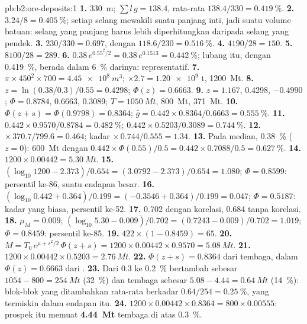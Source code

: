 \begin{solution}{pb:b2:ore-deposits:1}
\textbf{1.} \qty{330}{m}; $\sum l\,g = 138.4$, rata-rata $138.4/330 = \qty{0.419}{\percent}$.
\textbf{2.} $3.24/8 = \qty{0.405}{\percent}$; setiap selang mewakili suatu panjang inti, jadi suatu
volume batuan: selang yang panjang harus lebih diperhitungkan daripada selang yang pendek.
\textbf{3.} $230/330 = 0.697$, dengan $118.6/230 = \qty{0.516}{\percent}$.
\textbf{4.} $4190/28 = 150$.
\textbf{5.} $8100/28 = 289$.
\textbf{6.} $0.38\,e^{0.55^2/2} = 0.38\,e^{0.1513} = \qty{0.442}{\percent}$; lubang itu, dengan
\qty{0.419}{\percent}, berada dalam \qty{6}{\percent} darinya: representatif.
\textbf{7.} $\pi \times 450^2 \times 700 = \qty{4.45e8}{m^3}$; $\times 2.7 = \num{1.20e9}$ t,
\qty{1200}{Mt}.
\textbf{8.} $z = \ln(0.38/0.3)/0.55 = 0.4298$; $\Phi(z) = 0.6663$.
\textbf{9.} $z = 1.167$, 0.4298, $-0.4990$; $\Phi = 0.8784$, 0.6663, 0.3089; $T = \qty{1050}{Mt}$,
\qty{800}{Mt}, \qty{371}{Mt}.
\textbf{10.} $\Phi(z + s) = \Phi(0.9798) = 0.8364$; $\bar g = 0.442 \times 0.8364/0.6663 =
\qty{0.555}{\percent}$.
\textbf{11.} $0.442 \times 0.9570/0.8784 = \qty{0.482}{\percent}$; $0.442 \times 0.5203/0.3089 =
\qty{0.744}{\percent}$.
\textbf{12.}  $\times\, 370.7/799.6 = 0.464$; kadar $\times\, 0.744/0.555 = 1.34$.
\textbf{13.} Pada median, \qty{0.38}{\percent} ($z = 0$): \qty{600}{Mt} dengan $0.442 \times
\Phi(0.55)/0.5 = 0.442 \times 0.7088/0.5 = \qty{0.627}{\percent}$.
\textbf{14.} $1200 \times 0.00442 = \qty{5.30}{Mt}$.
\textbf{15.} $(\log_{10} 1200 - 2.373)/0.654 = (3.0792 - 2.373)/0.654 = 1.080$; $\Phi = 0.8599$:
persentil ke-86, suatu endapan besar.
\textbf{16.} $(\log_{10} 0.442 + 0.364)/0.199 = (-0.3546 + 0.364)/0.199 = 0.047$; $\Phi = 0.5187$: kadar
yang biasa, persentil ke-52.
\textbf{17.} 0.702 dengan korelasi, 0.684 tanpa korelasi.
\textbf{18.} $\mu_M = 0.009$; $(\log_{10} 5.30 - 0.009)/0.702 = (0.7243 - 0.009)/0.702 = 1.019$; $\Phi =
0.8459$: persentil ke-85.
\textbf{19.} $422 \times (1 - 0.8459) = 65$.
\textbf{20.} $M = T_0\,e^{\mu + s^2/2}\,\Phi(z + s) = 1200 \times 0.00442 \times 0.9570 =
\qty{5.08}{Mt}$.
\textbf{21.} $1200 \times 0.00442 \times 0.5203 = \qty{2.76}{Mt}$.
\textbf{22.} $\Phi(z + s) = 0.8364$ dari tembaga, dalam $\Phi(z) = 0.6663$ dari .
\textbf{23.} Dari 0.3 ke \qty{0.2}{\percent}  bertambah sebesar $1054 - 800 = \qty{254}{Mt}$
(\qty{32}{\percent}) dan tembaga sebesar $5.08 - 4.44 = \qty{0.64}{Mt}$ (\qty{14}{\percent}): blok-blok yang ditambahkan
rata-rata berkadar $0.64/254 = \qty{0.25}{\percent}$, yang termiskin dalam endapan itu.
\textbf{24.} $1200 \times 0.00442 \times 0.8364 = 800 \times 0.00555$: prospek itu memuat
\textbf{\qty[text-series-to-math=true]{4.44}{Mt}} tembaga di atas  \qty{0.3}{\percent}.
\end{solution}
